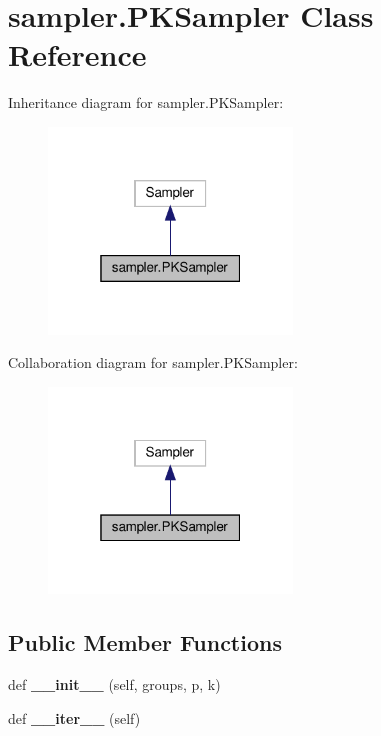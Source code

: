 \hypertarget{classsampler_1_1PKSampler}{}\section{sampler.\+P\+K\+Sampler Class Reference}
\label{classsampler_1_1PKSampler}


Inheritance diagram for sampler.\+P\+K\+Sampler\+:
\nopagebreak
\begin{figure}[H]
\begin{center}
\leavevmode
\includegraphics[width=184pt]{classsampler_1_1PKSampler__inherit__graph}
\end{center}
\end{figure}


Collaboration diagram for sampler.\+P\+K\+Sampler\+:
\nopagebreak
\begin{figure}[H]
\begin{center}
\leavevmode
\includegraphics[width=184pt]{classsampler_1_1PKSampler__coll__graph}
\end{center}
\end{figure}
\subsection*{Public Member Functions}
\begin{DoxyCompactItemize}
\item 
\mbox{\label{classsampler_1_1PKSampler_ae82efb9af36eb4f457de911035c14040}} 
def {\bfseries \+\_\+\+\_\+init\+\_\+\+\_\+} (self, groups, p, k)
\item 
\mbox{\label{classsampler_1_1PKSampler_a5656bdf41a3dd5e003faee073292a39e}} 
def {\bfseries \+\_\+\+\_\+iter\+\_\+\+\_\+} (self)
\end{DoxyCompactItemize}
